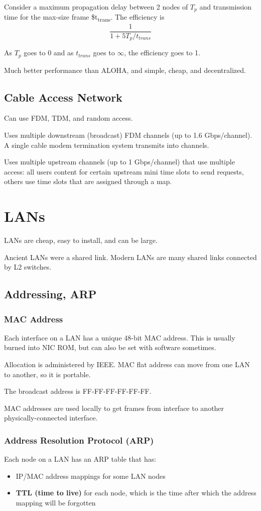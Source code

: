 \documentclass[11pt]{article}
\begin{document}
Consider a maximum propagation delay between 2 nodes of \(T_{p}\) and transmission time for the max-size
frame \$t\textsubscript{trans}.
The efficiency is
$$ \frac{1}{1 + 5T_{p}/t_{trans}} $$

As \(T_{p}\) goes to 0 and as \(t_{trans}\) goes to \(\infty\), the efficiency goes to 1.

Much better performance than ALOHA, and simple, cheap, and decentralized.
\subsection{Cable Access Network}
\label{sec:org5f7c313}
Can use FDM, TDM, and random access.

Uses multiple downstream (broadcast) FDM channels (up to 1.6 Gbps/channel).
A single cable modem termination system transmits into channels.

Uses multiple upstream channels (up to 1 Gbps/channel) that use multiple access:
all users content for certain upstream mini time slots to send requests, others use time slots that
are assigned through a map.
\section{LANs}
\label{sec:org15f335b}
LANs are cheap, easy to install, and can be large.

Ancient LANs were a shared link. Modern LANs are many shared links connected by L2 switches.
\subsection{Addressing, ARP}
\label{sec:orgf701efb}
\subsubsection{MAC Address}
\label{sec:org0af8549}
Each interface on a LAN has a unique 48-bit MAC address.
This is usually burned into NIC ROM, but can also be set with software sometimes.

Allocation is administered by IEEE.
MAC flat address can move from one LAN to another, so it is portable.

The broadcast address is FF-FF-FF-FF-FF-FF.

MAC addresses are used locally to get frames from interface to another physically-connected interface.
\subsubsection{Address Resolution Protocol (ARP)}
\label{sec:orgd55e21d}
Each node on a LAN has an ARP table that has:
\begin{itemize}
\item IP/MAC address mappings for some LAN nodes
\item \textbf{TTL (time to live)} for each node, which is the time after which the address mapping will be
forgotten
\end{itemize}
\end{document}
